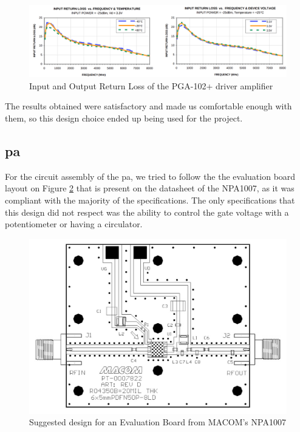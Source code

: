 \begin{figure}[H]
    \vspace*{0cm}
    \centering
    \includegraphics[width=0.9\linewidth]{figs/ch3_PGAioRLtheo.png}
    \caption{Input and Output Return Loss of the PGA-102+ driver amplifier \cite{MonolithicPGA-102+}}
    \label{fig:ch3_PGAioRLtheo.png}
\end{figure}

\par The results obtained were satisfactory and made us comfortable enough with them, so this design choice ended up being used for the project.

\subsection{\acl{pa}}
\par For the circuit assembly of the \ac{pa}, we tried to follow the the evaluation board layout on Figure \ref{fig:ch3_NPA1007eval.png} that is present on the datasheet of the NPA1007, as it was compliant with the majority of the specifications. The only specifications that this design did not respect was the ability to control the gate voltage with a potentiometer or having a circulator.

\begin{figure}[H]
    \vspace*{0cm}
    \centering
    \includegraphics[width=0.9\linewidth]{figs/ch3_NPA1007eval.png}
    \caption{Suggested design for an Evaluation Board from MACOM's NPA1007 \cite{NPA1007}}
    \label{fig:ch3_NPA1007eval.png}
\end{figure}


